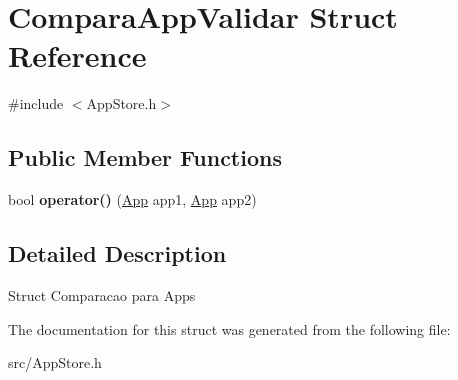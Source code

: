 \hypertarget{struct_compara_app_validar}{\section{Compara\+App\+Validar Struct Reference}
\label{struct_compara_app_validar}
}


{\ttfamily \#include $<$App\+Store.\+h$>$}

\subsection*{Public Member Functions}
\begin{DoxyCompactItemize}
\item 
\hypertarget{struct_compara_app_validar_ac926c55156668e1902056279ff439d81}{bool {\bfseries operator()} (\hyperlink{class_app}{App} app1, \hyperlink{class_app}{App} app2)}\label{struct_compara_app_validar_ac926c55156668e1902056279ff439d81}

\end{DoxyCompactItemize}


\subsection{Detailed Description}
Struct Comparacao para Apps 

The documentation for this struct was generated from the following file\+:\begin{DoxyCompactItemize}
\item 
src/App\+Store.\+h\end{DoxyCompactItemize}

